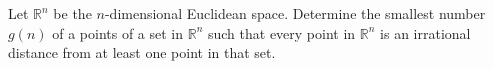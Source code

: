 Let $\mathbb{R}^n$ be the $n$-dimensional Euclidean space.  Determine the smallest number $g(n)$ of a points of a set in $\mathbb{R}^n$ such that every point in $\mathbb{R}^n$ is an irrational distance from at least one point in that set.